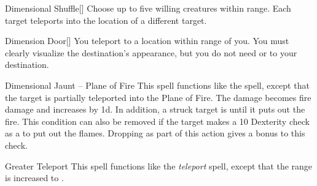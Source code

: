 \lowercase{\hypertarget{spell:Dimensional Shuffle}{}}\label{spell:Dimensional Shuffle}
\begin{ability}[\nth{2}]{\hypertarget{spell:Dimensional Shuffle}{Dimensional Shuffle}}[]
Choose up to five willing creatures within \rngmed range.
Each target teleports into the location of a different target.
\end{ability}
\vspace{0.25em}



\lowercase{\hypertarget{spell:Dimension Door}{}}\label{spell:Dimension Door}
\begin{ability}[\nth{3}]{\hypertarget{spell:Dimension Door}{Dimension Door}}[]
You teleport to a location within \rngext range of you.
You must clearly visualize the destination's appearance, but you do not need  or  to your destination.
\end{ability}
\vspace{0.25em}



\lowercase{\hypertarget{spell:Dimensional Jaunt -- Plane of Fire}{}}\label{spell:Dimensional Jaunt -- Plane of Fire}
\begin{ability}[\nth{3}]{\hypertarget{spell:Dimensional Jaunt -- Plane of Fire}{Dimensional Jaunt -- Plane of Fire}}
This spell functions like the  spell, except that the target is partially teleported into the Plane of Fire.
The damage becomes fire damage and increases by \plus1d.
In addition, a struck target is  until it puts out the fire.
This condition can also be removed if the target makes a  10 Dexterity check as a  to put out the flames.
Dropping  as part of this action gives a  bonus to this check.
\end{ability}
\vspace{0.25em}



\lowercase{\hypertarget{spell:Greater Teleport}{}}\label{spell:Greater Teleport}
\begin{ability}[\nth{3}]{\hypertarget{spell:Greater Teleport}{Greater Teleport}}
This spell functions like the \textit{teleport} spell, except that the range is increased to \rngext.
\end{ability}
\vspace{0.25em}



